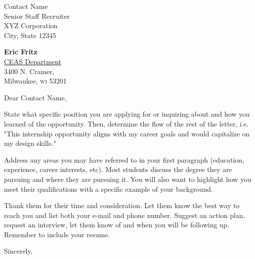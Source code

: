 \documentclass[11pt]{letter}
\def\contactname{Contact Name}
\def\contactaddress{Senior Staff Recruiter \\ XYZ Corporation \\ City, State 12345}
\begin{document}
\begin{letter}{\contactname \\ \contactaddress}

\begin{center}
	{\large\bf Eric Fritz} \\ 
	\href{http://www4.uwm.edu/ceas/cs/}{CEAS Department} \\ 3400 N. Cramer, \\ \vspace{-0.05in} Milwaukee, \textsc{wi} 53201
\end{center} \vfill

\opening{Dear \contactname,}

\noindent State what specific position you are applying for or inquiring about and how you learned of the opportunity.  Then, determine the flow of the rest of the letter, i.e. "This internship opportunity aligns with my career goals and would capitalize on my design skills."

\noindent Address any areas you may have referred to in your first paragraph (education, experience, career interests, etc).  Most students discuss the degree they are pursuing and where they are pursuing it.  You will also want to highlight how you meet their qualifications with a specific example of your background.  

\noindent Thank them for their time and consideration.  Let them know the best way to reach you and list both your e-mail and phone number.  Suggest an action plan, request an interview, let them know of and when you will be following up.  Remember to include your resume.  

\closing{Sincerely,}

\end{letter}
\end{document}
